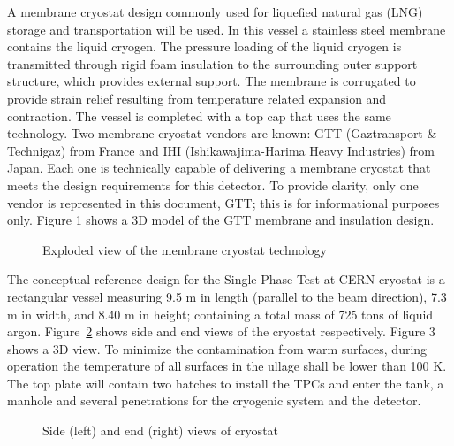 A membrane cryostat design commonly used for liquefied natural gas (LNG) storage and transportation will be used. In this vessel a stainless steel membrane contains the liquid cryogen. The pressure loading of the liquid cryogen is transmitted through rigid foam insulation to the surrounding outer support structure, which provides external support. The membrane is corrugated to provide strain relief resulting from temperature related expansion and contraction. The vessel is completed with a top cap that uses the same technology.
Two membrane cryostat vendors are known: GTT (Gaztransport \& Technigaz) from France and IHI (Ishikawajima-Harima Heavy Industries) from Japan. Each one is technically capable of delivering a membrane cryostat that meets the design requirements for this detector. To provide clarity, only one vendor is represented in this document, GTT; this is for informational purposes only. Figure 1 shows a 3D model of the GTT membrane and insulation design.


\begin{figure}
\begin{center}
\caption[Exploded view of the membrane cryostat technology]{\label{fig:lar-org} Exploded view of the membrane cryostat technology}
\end{center}
\end{figure}

The conceptual reference design for the Single Phase Test at CERN cryostat is a rectangular vessel measuring 9.5 m in length (parallel to the beam direction), 7.3 m in width, and 8.40 m in height; containing a total mass of 725 tons of liquid argon. Figure~\ref{fig:cryostat-views} shows side and end views of the cryostat respectively. Figure 3 shows a 3D view. To minimize the contamination from warm surfaces, during operation the temperature of all surfaces in the ullage shall be lower than 100 K. The top plate will contain two hatches to install the TPCs and enter the tank, a manhole and several penetrations for the cryogenic system and the detector.

\begin{figure}
\begin{center}
\caption[Views of cryostat]{\label{fig:cryostat-views} Side (left) and end (right) views of cryostat}
\end{center}
\end{figure}

